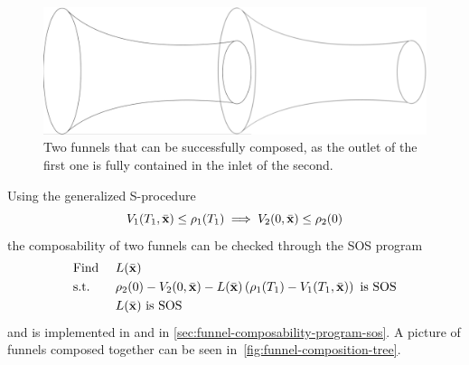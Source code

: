 \begin{figure}
  \centering \includegraphics[scale=.2]{figures/method/funnel-composition}
  \caption{Two funnels that can be successfully composed, as the outlet of the
    first one is fully contained in the inlet of the second.}
  \label{fig:two-funnels-composed}
\end{figure}

Using the generalized S-procedure
\begin{equation}
  V_1(T_1,\bar{\mathsf{\mathbf{x}}}) \leq \rho_1(T_1) \implies V_2(0, \bar{\mathsf{\mathbf{x}}}) \leq \rho_2(0)
\end{equation}
the composability of two funnels can be checked through the \ac{SOS} program
\begin{align}
  & \text{Find } && L(\bar{\mathsf{\mathbf{x}}}) \\
  & \text{s.t. } && \rho_2(0) - V_2(0,\bar{\mathsf{\mathbf{x}}}) - L(\bar{\mathsf{\mathbf{x}}})\left( \rho_1(T_1) - V_1(T_1,\bar{\mathsf{\mathbf{x}}}) \right) \text{ is SOS} \nonumber \\ 
  &&& L(\bar{\mathsf{\mathbf{x}}}) \text{ is SOS} \nonumber
\end{align}
and is implemented in \cite[sostools]{sostools} and \matlab{} in
\cref{sec:funnel-composability-program-sos}. A picture of funnels composed
together can be seen in~\cref{fig:funnel-composition-tree}.
